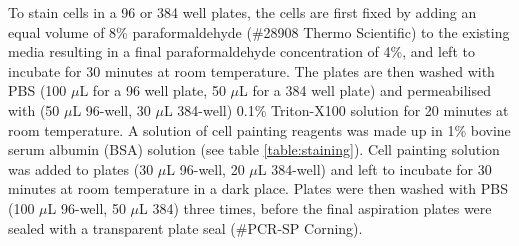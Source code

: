 \documentclass[a4paper,11pt,twoside,openright]{scrbook}
\begin{document}
To stain cells in a 96 or 384 well plates, the cells are first fixed by adding an equal volume of 8\% paraformaldehyde (\#28908 Thermo Scientific) to the existing media resulting in a final paraformaldehyde concentration of 4\%, and left to incubate for 30 minutes at room temperature.
The plates are then washed with PBS (100 $\mu$L for a 96 well plate, 50 $\mu$L for a 384 well plate) and permeabilised with (50 $\mu$L 96-well, 30 $\mu$L 384-well) 0.1\% Triton-X100 solution for 20 minutes at room temperature.
A solution of cell painting reagents was made up in 1\% bovine serum albumin (BSA) solution (see table \ref{table:staining}).
Cell painting solution was added to plates (30 $\mu$L 96-well, 20 $\mu$L 384-well) and left to incubate for 30 minutes at room temperature in a dark place.
Plates were then washed with PBS (100 $\mu$L 96-well, 50 $\mu$L 384) three times, before the final aspiration plates were sealed with a transparent plate seal (\#PCR-SP Corning).
\end{document}
